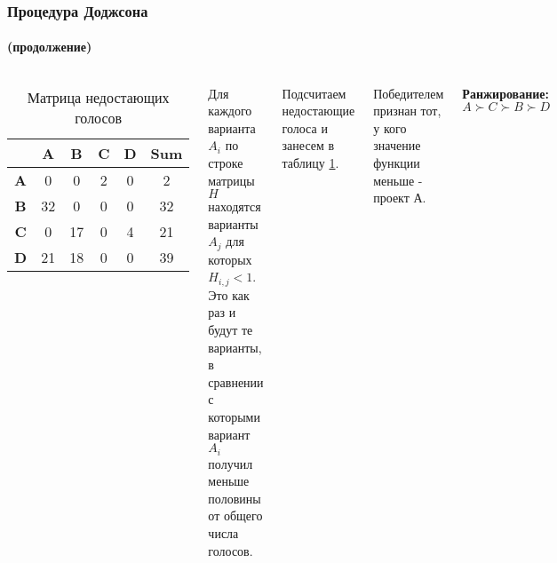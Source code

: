 \documentclass[10pt]{beamer}
\begin{document}
\begin{frame}
  \frametitle{Процедура Доджсона}
  \framesubtitle{(продолжение)}
  \begin{columns}
    \begin{table}
      \caption{Матрица недостающих голосов}
      \label{t4}
      \begin{tabular}{|c|c|c|c|c|c|}
        \hline
            & \textbf{A}  & \textbf{B}  & \textbf{C} & \textbf{D} & \textbf{Sum} \\
            \hline
          \textbf{A}	& 0	 & 0	& 2	& 0	& \cellcolor{yellow}2 \\
          \textbf{B}	& 32 & 0	& 0	& 0	& 32 \\
          \textbf{C}	& 0	 & 17	& 0	& 4	& 21 \\
          \textbf{D}	& 21 & 18	& 0	& 0	& 39 \\
          \hline
      \end{tabular}
    \end{table}
    Для каждого варианта $A_{i}$ по строке матрицы $H$ находятся варианты $A_{j}$ для которых $H_{i,j} < 1$. Это как раз и будут те варианты, в сравнении с которыми вариант $A_{i}$ получил меньше половины от общего числа голосов.

Подсчитаем недостающие голоса и занесем в таблицу \ref{t4}.

Победителем признан тот, у кого значение функции меньше - проект А.

\textbf{Ранжирование: $A \succ C \succ B \succ D$}

  \end{columns}
\end{frame}
\end{document}
